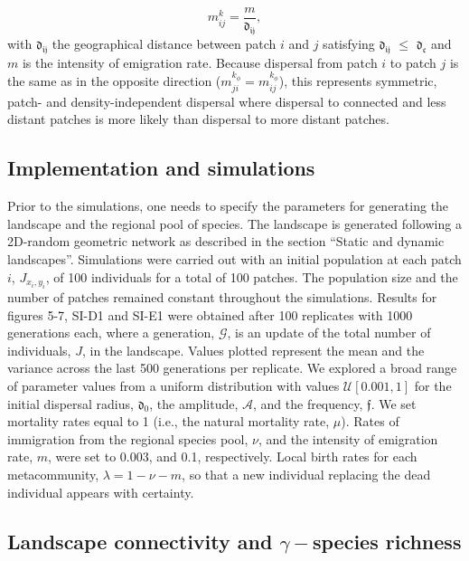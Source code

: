 \documentclass[12pt]{article}
\begin{document}
\begin{equation}
  m_{ij}^{k} =  \frac{m}{\mathfrak{d_{ij}}},
\label{neutdis}
\end{equation}
with $\mathfrak{d_{ij}}$ the geographical distance between patch $i$
and $j$ satisfying $\mathfrak{d_{ij}}$ $\leq$ $\mathfrak{d_{c}}$ and
$m$ is the intensity of emigration rate. Because dispersal from patch
$i$ to patch $j$ is the same as in the opposite direction
($m_{ji}^{k_{\phi}} = m_{ij}^{k_{\phi}}$), this represents symmetric, patch- and density-independent dispersal where dispersal to connected and less distant patches is more likely than dispersal to more
distant patches.

\subsection*{Implementation and simulations}

Prior to the simulations, one needs to specify the parameters for
generating the landscape and the regional pool of species. The
landscape is generated following a 2D-random geometric network as
described in the section ``Static and dynamic
landscapes''. Simulations were carried out with an initial population
at each patch $i$, $J_{x_i,y_i}$, of 100 individuals for a total of
100 patches. The population size and the number of patches remained
constant throughout the simulations. Results for figures 5-7, SI-D1 and SI-E1 were obtained after 100 replicates with 1000 generations each, where a generation, $\mathcal{G}$, is an update of the total number of individuals, $J$, in the landscape. Values plotted represent the mean and the variance
across the last 500 generations per replicate. We explored a broad range of parameter values
from a uniform distribution with values $\mathcal{U}[0.001,1]$ for the
initial dispersal radius, $\mathfrak{d_{0}}$, the amplitude,
$\mathcal{A}$, and the frequency, $\mathfrak{f}$. We set mortality
rates equal to 1 (i.e., the natural mortality rate, $\mu$). Rates of
immigration from the regional species pool, $\nu$, and the intensity
of emigration rate, $m$, were set to 0.003, and
0.1, respectively. Local birth rates for each metacommunity,
$\lambda = 1 - \nu - m$, so that a new individual replacing the dead
individual appears with certainty.

\subsection*{Landscape connectivity and $\gamma-$species richness}
\end{document}
